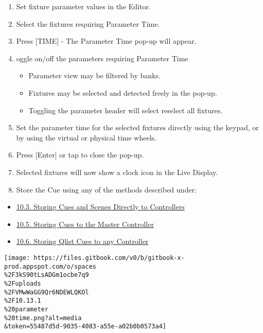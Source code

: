 \documentclass[
]{article}
\providecommand{\tightlist}{%
  \setlength{\itemsep}{0pt}\setlength{\parskip}{0pt}}
\begin{document}
\begin{enumerate}
\def\labelenumi{\arabic{enumi}.}
\item
  Set fixture parameter values in the Editor.
\item
  Select the fixtures requiring Parameter Time.
\item
  Press {[}TIME{]} - The Parameter Time pop-up will appear.
\item
  oggle on/off the parameters requiring Parameter Time

  \begin{itemize}
  \item
    Parameter view may be filtered by banks.
  \item
    Fixtures may be selected and detected freely in the pop-up.
  \item
    Toggling the parameter header will select reselect all fixtures.
  \end{itemize}
\item
  Set the parameter time for the selected fixtures directly using the keypad, or by using the virtual or physical time wheels.
\item
  Press {[}Enter{]} or tap \href{image.png}{} to close the pop-up.
\item
  Selected fixtures will now show a clock icon in the Live Display.
\item
  Store the Cue using any of the methods described under:
\end{enumerate}

\begin{itemize}
\tightlist
\item
  \href{https://vibemanual.compulite.com/programming-cues-and-scenes.html\#storing-cues-and-scenes-directly-to-controllers}{10.3. Storing Cues and Scenes Directly to Controllers}
\item
  \href{https://vibemanual.compulite.com/programming-cues-and-scenes.html\#storing-cues-to-the-master-controller}{10.5. Storing Cues to the Master Controller}
\item
  \href{https://vibemanual.compulite.com/programming-cues-and-scenes.html\#storing-qlist-cues-to-any-controller}{10.6. Storing Qlist Cues to any Controller}
\end{itemize}

\texttt{[image: https://files.gitbook.com/v0/b/gitbook-x-prod.appspot.com/o/spaces\\\%2F3kS90tLsADGm1ocbe7q9\\\%2Fuploads\\\%2FVMwWaGG9Qr6NDEWLQKOl\\\%2F10.13.1\\\%20parameter\\\%20time.png?alt=media\\\&token=55487d5d-9035-4083-a55e-a02b0b0573a4]}
\end{document}
